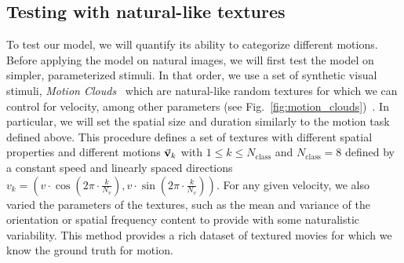 \documentclass[default]{sn-jnl}%
\theoremstyle{thmstyleone}%
\theoremstyle{thmstyletwo}%
\theoremstyle{thmstylethree}%
\newcommand{\seeFig}[1]{see Fig.~\ref{fig:#1}}%
\newcommand{\Nclass}{N_\text{class}} %
\newcommand{\kernelind}{k} %
\newcommand{\speed}{v}
\newcommand{\Nspeed}{N_v}
\newcommand{\note}[1]{{\sethlcolor{yellow}\hl{#1}}}
\begin{document}
%

%
\subsection{Testing with natural-like textures}
To test our model, we will quantify its ability to categorize different motions. Before applying the model on natural images, we will first test the model on simpler, parameterized stimuli. In that order, we use a set of synthetic visual stimuli, \textit{Motion Clouds}~\citep{leon_motion_2012} which are natural-like random textures for which we can control for velocity, among other parameters (\seeFig{motion_clouds})~\citep{vacher_bayesian_2018}. In particular, we will set the spatial size and duration similarly to the motion task defined above.
This procedure defines a set of textures with different spatial properties and different motions $\va{v}_k$ with  $1 \le k \le \Nclass$ and $\Nclass=8$ defined by a constant speed and linearly spaced directions $
\speed_\kernelind = 
  ( 
    \speed \cdot \cos(2\pi\cdot \frac{\kernelind}{\Nspeed}),
    \speed \cdot \sin(2\pi\cdot \frac{\kernelind}{\Nspeed})
  )
$.
For any given velocity, we also varied the parameters of the textures, such as the mean and variance of the orientation or spatial frequency content to provide with some naturalistic variability. This method provides a rich dataset of textured movies for which we know the ground truth for motion.
\end{document}
